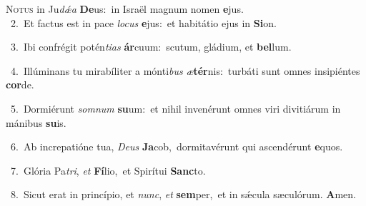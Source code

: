 \lettrine{\initial\textcolor{\initialcolor}{N}}{otus} in Ju\-\textit{dǽ}\-\textit{a} \textbf{De}\-us:~\star in Israël magnum nomen \textbf{e}\-jus.\\
{\numbfont\textcolor{\numbcolor}{~2.}}~Et factus est in pace \textit{lo}\-\textit{cus} \textbf{e}\-jus:~\star et habitátio ejus in \textbf{Si}\-on.\par
{\numbfont\textcolor{\numbcolor}{~3.}}~Ibi confrégit potén\-\textit{ti}\-\textit{as} \textbf{ár}\-cuum:~\star scutum, gládium, et \textbf{bel}\-lum.\par
{\numbfont\textcolor{\numbcolor}{~4.}}~Illúminans tu mirabíliter a mónti\textit{bus} \textit{æ}\-\textbf{tér}nis:~\star turbáti sunt omnes insipiéntes \textbf{cor}\-de.\par
{\numbfont\textcolor{\numbcolor}{~5.}}~Dormiérunt \textit{som}\-\textit{num} \textbf{su}\-um:~\star et nihil invenérunt omnes viri divitiárum in mánibus \textbf{su}\-is.\par
{\numbfont\textcolor{\numbcolor}{~6.}}~Ab increpatióne tua, \textit{De}\-\textit{us} \textbf{Ja}\-cob,~\star dormitavérunt qui ascendérunt \textbf{e}\-quos.\par
{\numbfont\textcolor{\numbcolor}{~7.}}~Glória Pa\-\textit{tri}\-, \textit{et} \textbf{Fí}\-lio,~\star et Spirítui \textbf{Sanc}\-to.\par
{\numbfont\textcolor{\numbcolor}{~8.}}~Sicut erat in princípio, et \textit{nunc}\-, \textit{et} \textbf{sem}\-per,~\star et in sǽcula sæculórum. \textbf{A}\-men.\par
